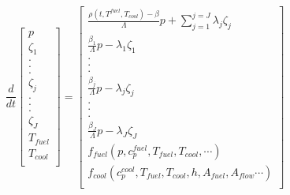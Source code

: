 

\begin{equation}
  \frac{d}{dt}\left[
    \begin{array}{c}
      p\\
      \zeta_1\\
      .\\
      .\\
      .\\
      \zeta_j\\
      .\\
      .\\
      .\\
      \zeta_J\\
      T_{fuel}\\
      T_{cool}\\
    \end{array}
    \right]
    =
    \left[
      \begin{array}{ c }
        \frac{\rho(t,T^{fuel},T_{cool})-\beta}{\Lambda}p +
        \displaystyle\sum^{j=J}_{j=1}\lambda_j\zeta_j\\
        \frac{\beta_1}{\Lambda} p - \lambda_1\zeta_1\\
        .\\
        .\\
        .\\
        \frac{\beta_j}{\Lambda}p-\lambda_j\zeta_j\\
        .\\
        .\\
        .\\
        \frac{\beta_J}{\Lambda}p-\lambda_J\zeta_J\\
        f_{fuel}(p, c_p^{fuel}, T_{fuel}, T_{cool},\cdots)\\
        f_{cool}(c_p^{cool}, T_{fuel}, T_{cool},h,A_{fuel},A_{flow}\cdots)\\
      \end{array}
      \right]
      \label{eqn:full_prke}
    \end{equation}

